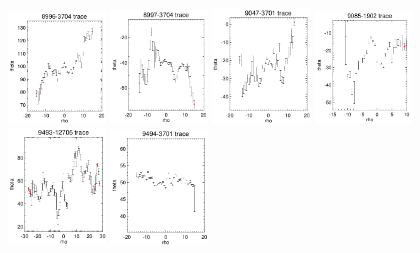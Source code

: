 \documentclass[fleqn,usenatbib]{mnras}
\begin{document}
\begin{figure}
    \includegraphics[width=0.23\textwidth]{Images/SN1-MC250/CPSBs/8996-3704-1-250.png}
    \includegraphics[width=0.23\textwidth]{Images/SN1-MC250/CPSBs/8997-3704-1-250.png}
    \includegraphics[width=0.23\textwidth]{Images/SN1-MC250/CPSBs/9047-3701-1-250.png}
    \includegraphics[width=0.23\textwidth]{Images/SN1-MC250/CPSBs/9085-1902-1-250.png}
    \includegraphics[width=0.23\textwidth]{Images/SN1-MC250/CPSBs/9493-12705-1-250.png}
    \includegraphics[width=0.23\textwidth]{Images/SN1-MC250/CPSBs/9494-3701-1-250.png}

\end{figure}
\end{document}
